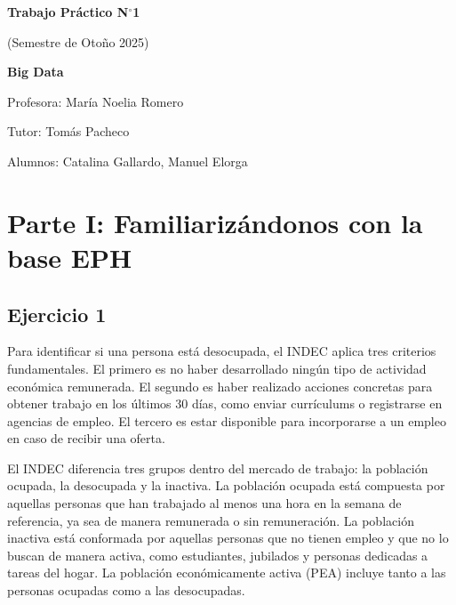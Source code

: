 \documentclass[11pt,a4paper]{article}
\begin{document}
\begin{titlepage}
\centering
\vspace*{3cm}

{\LARGE\bfseries Trabajo Práctico N$^{\circ}$1\par}
\vspace{0.4cm}
{\large (Semestre de Otoño 2025)\par}
\vspace{0.3cm}
{\large\bfseries Big Data\par}

\vfill

{\large Profesora: María Noelia Romero\par}
\vspace{0.2cm}
{\large Tutor: Tomás Pacheco\par}
\vspace{0.2cm}
{\large Alumnos: Catalina Gallardo, Manuel Elorga\par}

\vfill
\end{titlepage}

\section*{Parte I: Familiarizándonos con la base EPH}

\subsection*{Ejercicio 1}

Para identificar si una persona está desocupada, el INDEC aplica tres criterios
fundamentales. El primero es no haber desarrollado ningún tipo de actividad económica
remunerada. El segundo es haber realizado acciones concretas para obtener trabajo en los
últimos 30 días, como enviar currículums o registrarse en agencias de empleo. El tercero es
estar disponible para incorporarse a un empleo en caso de recibir una oferta.

El INDEC diferencia tres grupos dentro del mercado de trabajo: la población ocupada, la
desocupada y la inactiva. La población ocupada está compuesta por aquellas personas que
han trabajado al menos una hora en la semana de referencia, ya sea de manera remunerada o
sin remuneración. La población inactiva está conformada por aquellas personas que no tienen
empleo y que no lo buscan de manera activa, como estudiantes, jubilados y personas dedicadas
a tareas del hogar. La población económicamente activa (PEA) incluye tanto a las personas
ocupadas como a las desocupadas.
\end{document}
